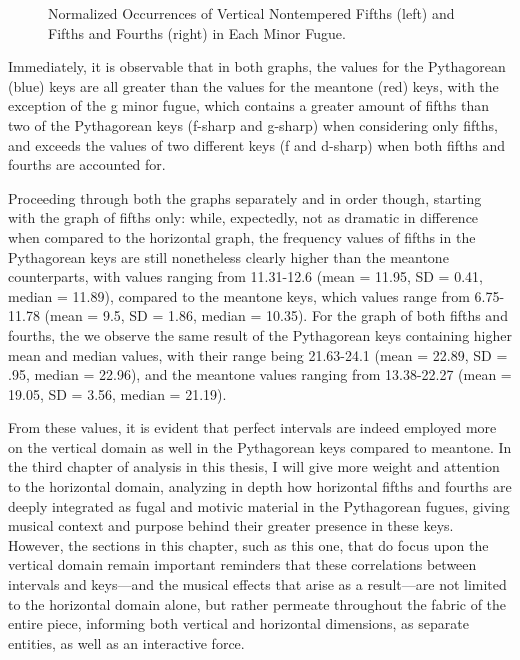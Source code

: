 \begin{figure}[H]
\vspace{1.5em}
    \centering
    \caption[Normalized Occurrences of Vertical Nontempered Fifths and Fourths in Each Minor Fugue. ]{Normalized Occurrences of Vertical Nontempered Fifths (left) and Fifths and Fourths (right) in Each Minor Fugue.}
\end{figure}    Immediately, it is observable that in both graphs, the values for the
Pythagorean (blue) keys are all greater than the values for the meantone
(red) keys, with the exception of the g minor fugue, which contains a
greater amount of fifths than two of the Pythagorean keys (f-sharp and
g-sharp) when considering only fifths, and exceeds the values of two
different keys (f and d-sharp) when both fifths and fourths are
accounted for.

Proceeding through both the graphs separately and in order though,
starting with the graph of fifths only: while, expectedly, not as
dramatic in difference when compared to the horizontal graph, the
frequency values of fifths in the Pythagorean keys are still nonetheless
clearly higher than the meantone counterparts, with values ranging from
11.31-12.6 (mean = 11.95, SD = 0.41, median = 11.89), compared to the
meantone keys, which values range from 6.75-11.78 (mean = 9.5, SD =
1.86, median = 10.35). For the graph of both fifths and fourths, the we
observe the same result of the Pythagorean keys containing higher mean
and median values, with their range being 21.63-24.1 (mean = 22.89, SD =
.95, median = 22.96), and the meantone values ranging from 13.38-22.27
(mean = 19.05, SD = 3.56, median = 21.19).

From these values, it is evident that perfect intervals are indeed
employed more on the vertical domain as well in the Pythagorean keys
compared to meantone. In the third chapter of analysis in this thesis, I
will give more weight and attention to the horizontal domain, analyzing
in depth how horizontal fifths and fourths are deeply integrated as
fugal and motivic material in the Pythagorean fugues, giving musical
context and purpose behind their greater presence in these keys.
However, the sections in this chapter, such as this one, that do focus
upon the vertical domain remain important reminders that these
correlations between intervals and keys---and the musical effects
that arise as a result---are not limited to the horizontal domain
alone, but rather permeate throughout the fabric of the entire piece,
informing both vertical and horizontal dimensions, as separate entities,
as well as an interactive force.

